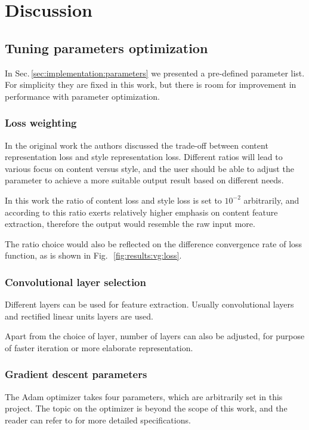 
\chapter{Discussion}
\label{chap:discussion}


\section{Tuning parameters optimization}
\label{sec:discussion:parameter}

In Sec.\,\ref{sec:implementation:parameters} we presented a pre-defined parameter list.
For simplicity they are fixed in this work,
but there is room for improvement in performance with parameter optimization.

\subsection{Loss weighting}
In the original work \cite{Gatys:2016gj} the authors discussed the trade-off
between content representation loss and style representation loss.
Different ratios will lead to various focus on content versus style,
and the user should be able to adjust the parameter to achieve a more suitable output result
based on different needs.


In this work the ratio of content loss and style loss is set to $10^{-2}$ arbitrarily,
and according to \cite{Gatys:2016gj} this ratio exerts relatively higher emphasis on content feature extraction,
therefore the output would resemble the raw input more.


The ratio choice would also be reflected on the difference convergence rate of loss function,
as is shown in Fig.\,~\ref{fig:results:vg:loss}.

\subsection{Convolutional layer selection}
Different layers can be used for feature extraction.
Usually convolutional layers and rectified linear units layers are used.


Apart from the choice of layer, number of layers can also be adjusted,
for purpose of faster iteration or more elaborate representation.

\subsection{Gradient descent parameters}
The Adam optimizer takes four parameters, which are arbitrarily set in this project.
The topic on the optimizer is beyond the scope of this work,
and the reader can refer to \cite{kingma2014adam} for more detailed specifications.


